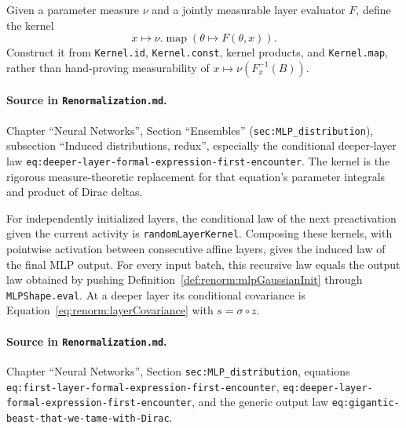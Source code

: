 \begin{definition}
\label{def:renorm:randomLayerKernel}
Given a parameter measure $\nu$ and a jointly measurable layer evaluator $F$, define the kernel
\[
  x\longmapsto \nu.\operatorname{map}(\theta\mapsto F(\theta,x)).
\]
Construct it from \texttt{Kernel.id}, \texttt{Kernel.const}, kernel products, and
\texttt{Kernel.map}, rather than hand-proving measurability of $x\mapsto\nu(F_x^{-1}(B))$.

\paragraph{Source in \texttt{Renormalization.md}.}
Chapter ``Neural Networks'', Section ``Ensembles'' (\texttt{sec:MLP\_distribution}), subsection
``Induced distributions, redux'', especially the conditional deeper-layer law
\texttt{eq:deeper-layer-formal-expression-first-encounter}.  The kernel is the rigorous
measure-theoretic replacement for that equation's parameter integrals and product of Dirac deltas.
\end{definition}

\begin{theorem}
\label{thm:renorm:deepKernelLaw}
For independently initialized layers, the conditional law of the next preactivation given the
current activity is \texttt{randomLayerKernel}.  Composing these kernels, with pointwise activation
between consecutive affine layers, gives the induced law of the final MLP output.  For every input
batch, this recursive law equals the output law obtained by pushing
Definition~\ref{def:renorm:mlpGaussianInit} through \texttt{MLPShape.eval}.  At a deeper layer its
conditional covariance is Equation~\eqref{eq:renorm:layerCovariance} with $s=\sigma\circ z$.

\paragraph{Source in \texttt{Renormalization.md}.}
Chapter ``Neural Networks'', Section \texttt{sec:MLP\_distribution}, equations
\texttt{eq:first-layer-formal-expression-first-encounter},
\texttt{eq:deeper-layer-formal-expression-first-encounter}, and the generic output law
\texttt{eq:gigantic-beast-that-we-tame-with-Dirac}.
\end{theorem}


